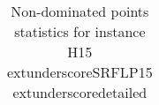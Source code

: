 \begin{table}
\caption{Non-dominated points statistics for instance H15	extunderscoreSRFLP15	extunderscoredetailed}
\label{tab:stats/H15_SRFLP15_detailed}
\begin{tabular}{}
\toprule
\midrule
\bottomrule
\end{tabular}
\end{table}
